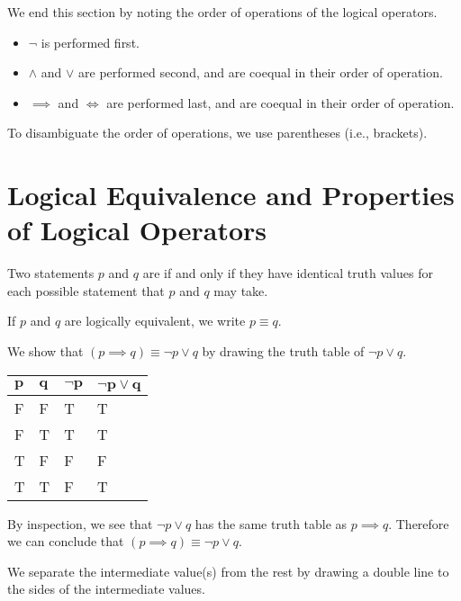 We end this section by noting the order of operations of the logical operators.
\begin{itemize}
    \item $\lnot$ is performed first.
    \item $\land$ and $\lor$ are performed second, and are coequal in their order of operation.
    \item $\implies$ and $\iff$ are performed last, and are coequal in their order of operation.
\end{itemize}
To disambiguate the order of operations, we use parentheses (i.e., brackets).

\section{Logical Equivalence and Properties of Logical Operators}
\begin{definition}
    Two statements $p$ and $q$ are  if and only if they have identical truth values for each possible statement that $p$ and $q$ may take.

    If $p$ and $q$ are logically equivalent, we write $p \equiv q$.
\end{definition}

\begin{example}\label{example-implication-law}
    We show that $(p \implies q) \equiv \lnot p \lor q$ by drawing the truth table of $\lnot p \lor q$.
    \begin{table}[H]
        \centering
        \begin{tabular}{|l|l||l||l|}
            \hline
            $\boldsymbol{p}$ & $\boldsymbol{q}$ & $\boldsymbol{\lnot p}$ & $\boldsymbol{\lnot p \lor q}$ \\ \hline
            F & F & T & T \\ \hline
            F & T & T & T \\ \hline
            T & F & F & F \\ \hline
            T & T & F & T \\ \hline
        \end{tabular}
    \end{table}

    By inspection, we see that $\lnot p \lor q$ has the same truth table as $p \implies q$. Therefore we can conclude that $(p \implies q) \equiv \lnot p \lor q$.
\end{example}
\begin{remark}
    We separate the intermediate value(s) from the rest by drawing a double line to the sides of the intermediate values.
\end{remark}

